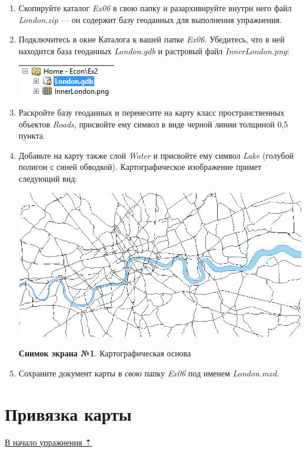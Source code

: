 \documentclass[]{book}
\theoremstyle{definition}
\theoremstyle{definition}
\theoremstyle{definition}
\theoremstyle{remark}
\begin{document}
\begin{enumerate}
\def\labelenumi{\arabic{enumi}.}
\item
  Скопируйте каталог \emph{Ex06} в свою папку и разархивируйте внутри
  него файл \emph{London.zip} --- он содержит базу геоданных для
  выполнения упражнения.
\item
  Подключитесь в окне Каталога к вашей папке \emph{Ex06}. Убедитесь, что
  в ней находится база геоданных \emph{London.gdb} и растровый файл
  \emph{InnerLondon.png}:

  \includegraphics{images/Ex06/image6.png}
\item
  Раскройте базу геоданных и перенесите на карту класс пространственных
  объектов \emph{Roads}, присвойте ему символ в виде черной линии
  толщиной 0,5 пункта.
\item
  Добавьте на карту также слой \emph{Water} и присвойте ему символ
  \emph{Lake} (голубой полигон с синей обводкой). Картографическое
  изображение примет следующий вид:

  \includegraphics{images/Ex06/image7.png}

  \textbf{Снимок экрана №1}. Картографическая основа
\item
  Сохраните документ карты в \emph{свою} папку \emph{Ex06} под именем
  \emph{London.mxd}.
\end{enumerate}

\hypertarget{map-ref-economic-referencing}{%
\section{Привязка карты}\label{map-ref-economic-referencing}}

\protect\hyperlink{map-ref-economic}{В начало упражнения ⇡}
\end{document}
